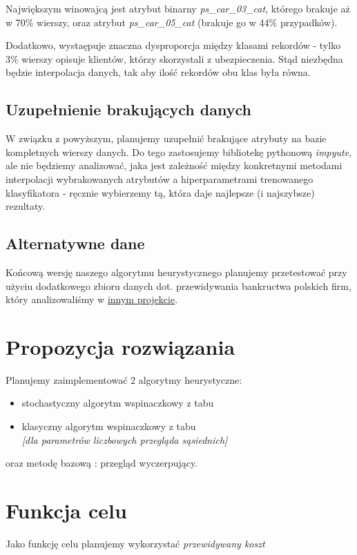 \documentclass[11pt]{article}
\begin{document}
Największym winowajcą jest atrybut binarny \textsl{ps\_car\_03\_cat}, którego brakuje aż w 70\% wierszy, oraz atrybut \textsl{ps\_car\_05\_cat} (brakuje go w 44\% przypadków).

Dodatkowo, wystaępuje znaczna dysproporcja między klasami rekordów - tylko 3\% wierszy opisuje klientów, którzy skorzystali z ubezpieczenia. Stąd niezbędna będzie interpolacja danych, tak aby ilość rekordów obu klas była równa.

\subsection{Uzupełnienie brakujących danych}
W związku z powyższym, planujemy uzupełnić brakujące atrybuty na bazie kompletnych wierszy danych. Do tego zastosujemy bibliotekę pythonową \textsl{impyute}, ale nie będziemy analizować, jaka jest zależność między konkretnymi metodami interpolacji wybrakowanych atrybutów a hiperparametrami trenowanego klasyfikatora - ręcznie wybierzemy tą, która daje najlepsze (i najszybsze) rezultaty.

\subsection{Alternatywne dane}
Końcową wersję naszego algorytmu heurystycznego planujemy przetestować przy użyciu dodatkowego zbioru danych dot. przewidywania bankructwa polskich firm, który analizowaliśmy w \href{https://github.com/przestaw/Data_Mining_Bancrupcy}{innym projekcie}.


\section{Propozycja rozwiązania}
Planujemy zaimplementować 2 algorytmy heurystyczne:
\begin{itemize}
	\item stochastyczny algorytm wspinaczkowy z tabu
	\item klasyczny algorytm wspinaczkowy z tabu \\
		\textsl{[dla parametrów liczbowych przegląda sąsiednich]}
\end{itemize}
oraz metodę bazową : przegląd wyczerpujący.

\section{Funkcja celu}
Jako funkcję celu planujemy wykorzystać \textsl{przewidywany koszt}
\end{document}
